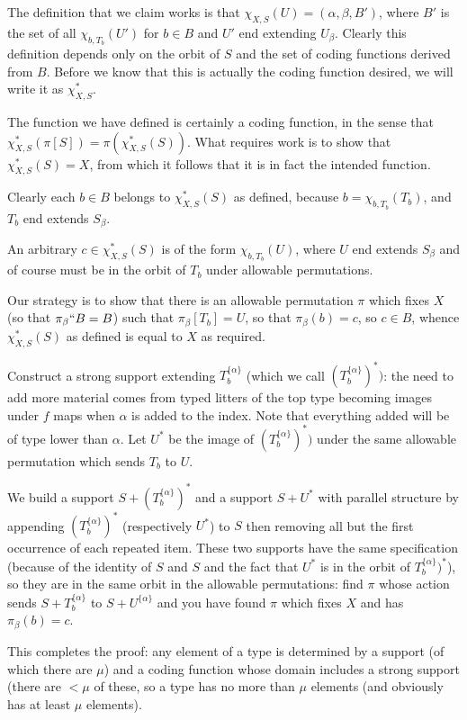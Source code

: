 \documentclass[112pt]{article}
\begin{document}
\begin{description}
The definition that we claim works is that $\chi_{X,S}(U) = (\alpha,\beta,B')$, where $B'$ is the set of all $\chi_{b,T_b}(U')$ for $b \in B$ and $U'$ end extending $U_\beta$.  Clearly this definition depends only on the orbit of $S$ and the set of coding functions derived from $B$.  Before we know that this is actually the coding function desired, we will write it as $\chi_{X,S}^*$.

The function we have defined is certainly a coding function, in the sense that $\chi_{X,S}^*(\pi[S]) = \pi(\chi_{X,S}^*(S))$.  What requires work is to show that
$\chi_{X,S}^*(S)=X$, from which it follows that it is in fact the intended function.

Clearly each $b \in B$ belongs to $\chi^*_{X,S}(S)$ as defined, because $b = \chi_{b,T_b}(T_b)$, and $T_b$ end extends $S_\beta$.

An arbitrary $c \in \chi_{X,S}^*(S)$ is of the form $\chi_{b,T_b}(U)$, where $U$ end extends $S_\beta$ and of course must be in the orbit of $T_b$ under allowable permutations.

Our strategy is to show that there is an allowable permutation $\pi$ which fixes $X$ (so that $\pi_\beta``B = B$) such that $\pi_\beta[T_b]=U$, so that
$\pi_\beta(b) = c$, so $c \in B$, whence $\chi^*_{X,S}(S)$ as defined is equal to $X$ as required.

Construct a strong support extending $T_b^{\{\alpha\}}$ (which we call $(T_b^{\{\alpha\}})^*)$:  the need to add more material comes
from typed litters of the top type becoming images under $f$ maps when $\alpha$ is added to the index.  Note that everything added will be of type lower than $\alpha$.  Let $U^*$ be the image of $(T_b^{\{\alpha\}})^*)$ under the same allowable permutation which sends $T_b$ to $U$.

We build a support $S+(T_b^{\{\alpha\}})^*$ and a support $S+U^*$ with parallel structure by appending $(T_b^{\{\alpha\}})^*$ (respectively $U^*$) to $S$ then removing all but the first occurrence of each repeated item.   These two supports have the same specification (because of the identity of $S$ and $S$
and the fact that $U^*$ is in the orbit of $T_b^{\{\alpha\}})^*$), so they are in the same orbit in the allowable permutations:  find $\pi$ whose action sends $S+T_b^{\{\alpha\}}$ to $S+U^{\{\alpha\}}$ and you have found $\pi$ which fixes $X$ and has $\pi_\beta(b)=c$.

\end{description}

This completes the proof:  any element of a type is determined by a support (of which there are $\mu$) and a coding function whose domain includes a strong support (there are $<\mu$ of these, so a type has no more than $\mu$ elements (and obviously has at least $\mu$ elements).
\end{document}
